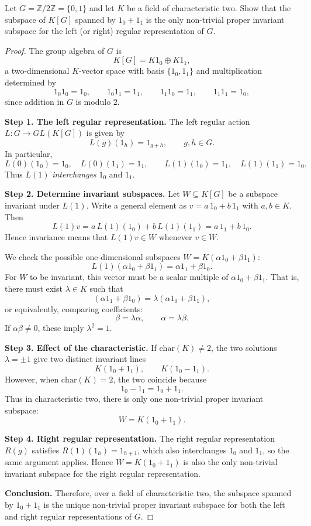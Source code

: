 \begin{exercise}[1.2.4]\label{ex:1.2.4}
Let $G=\mathbb{Z}/2\mathbb{Z}=\{0,1\}$ and let $K$ be a field of characteristic two.
Show that the subspace of $K[G]$ spanned by $1_0+1_1$ is the only non-trivial proper invariant subspace
for the left (or right) regular representation of $G$.
\end{exercise}

\begin{proof}
The group algebra of $G$ is
\[
K[G]=K1_0\oplus K1_1,
\]
a two-dimensional $K$-vector space with basis $\{1_0,1_1\}$ and multiplication determined by
\[
1_0 1_0 = 1_0, \qquad
1_0 1_1 = 1_1, \qquad
1_1 1_0 = 1_1, \qquad
1_1 1_1 = 1_0,
\]
since addition in $G$ is modulo $2$.

\medskip
\noindent\textbf{Step 1. The left regular representation.}
The left regular action $L:G\to GL(K[G])$ is given by
\[
L(g)(1_h) = 1_{g+h}, \qquad g,h\in G.
\]
In particular,
\[
L(0)(1_0)=1_0, \quad L(0)(1_1)=1_1, \qquad
L(1)(1_0)=1_1, \quad L(1)(1_1)=1_0.
\]
Thus $L(1)$ \emph{interchanges} $1_0$ and $1_1$.

\medskip
\noindent\textbf{Step 2. Determine invariant subspaces.}
Let $W\subseteq K[G]$ be a subspace invariant under $L(1)$.
Write a general element as $v=a\,1_0+b\,1_1$ with $a,b\in K$.
Then
\[
L(1)v = a\,L(1)(1_0) + b\,L(1)(1_1) = a\,1_1 + b\,1_0.
\]
Hence invariance means that $L(1)v\in W$ whenever $v\in W$.

We check the possible one-dimensional subspaces \( W = K(\alpha 1_0 + \beta 1_1) \):
\[
L(1)(\alpha 1_0 + \beta 1_1) = \alpha 1_1 + \beta 1_0.
\]
For $W$ to be invariant, this vector must be a scalar multiple of $\alpha 1_0+\beta 1_1$.
That is, there must exist $\lambda\in K$ such that
\[
(\alpha 1_1 + \beta 1_0) = \lambda(\alpha 1_0 + \beta 1_1),
\]
or equivalently, comparing coefficients:
\[
\beta = \lambda\alpha, \qquad \alpha = \lambda\beta.
\]
If $\alpha\beta\ne0$, these imply $\lambda^2=1$.

\medskip
\noindent\textbf{Step 3. Effect of the characteristic.}
If $\mathrm{char}(K)\ne2$, the two solutions $\lambda=\pm1$ give two distinct invariant lines
\[
K(1_0+1_1), \qquad K(1_0-1_1).
\]
However, when $\mathrm{char}(K)=2$, the two coincide because
\[
1_0 - 1_1 = 1_0 + 1_1.
\]
Thus in characteristic two, there is only one non-trivial proper invariant subspace:
\[
W = K(1_0 + 1_1).
\]

\medskip
\noindent\textbf{Step 4. Right regular representation.}
The right regular representation $R(g)$ satisfies $R(1)(1_h)=1_{h+1}$, which also interchanges $1_0$ and $1_1$,
so the same argument applies.  
Hence $W=K(1_0+1_1)$ is also the only non-trivial invariant subspace for the right regular representation.

\medskip
\noindent\textbf{Conclusion.}
Therefore, over a field of characteristic two, the subspace spanned by $1_0+1_1$ is the unique non-trivial proper invariant subspace for both the left and right regular representations of $G$.
\end{proof}

